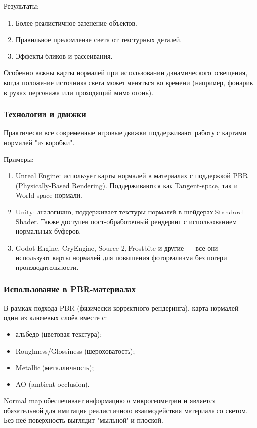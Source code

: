 Результаты:
\begin{enumerate}
	\item Более реалистичное затенение объектов.
	\item Правильное преломление света от текстурных деталей.
	\item Эффекты бликов и рассеивания.
\end{enumerate}

Особенно важны карты нормалей при использовании динамического освещения, когда положение источника света может меняться во времени (например, фонарик в руках персонажа или проходящий мимо огонь).
\subsubsection{Технологии и движки}

Практически все современные игровые движки поддерживают работу с картами нормалей "из коробки".

Примеры:
\begin{enumerate}
	\item Unreal Engine: использует карты нормалей в материалах с поддержкой PBR (Physically-Based Rendering). Поддерживаются как Tangent-space, так и World-space нормали.
	\item Unity: аналогично, поддерживает текстуры нормалей в шейдерах Standard Shader. Также доступен пост-обработочный рендеринг с использованием нормальных буферов.
	\item Godot Engine, CryEngine, Source 2, Frostbite и другие — все они используют карты нормалей для повышения фотореализма без потери производительности.
\end{enumerate}
\subsubsection{Использование в PBR-материалах}

В рамках подхода PBR (физически корректного рендеринга), карта нормалей — один из ключевых слоёв вместе с:
\begin{itemize}
	\item альбедо (цветовая текстура);
	\item Roughness/Glossiness (шероховатость);
	\item Metallic (металличность);
	\item AO (ambient occlusion).
\end{itemize}

Normal map обеспечивает информацию о микрогеометрии и является обязательной для имитации реалистичного взаимодействия материала со светом. Без неё поверхность выглядит "мыльной" и плоской.
